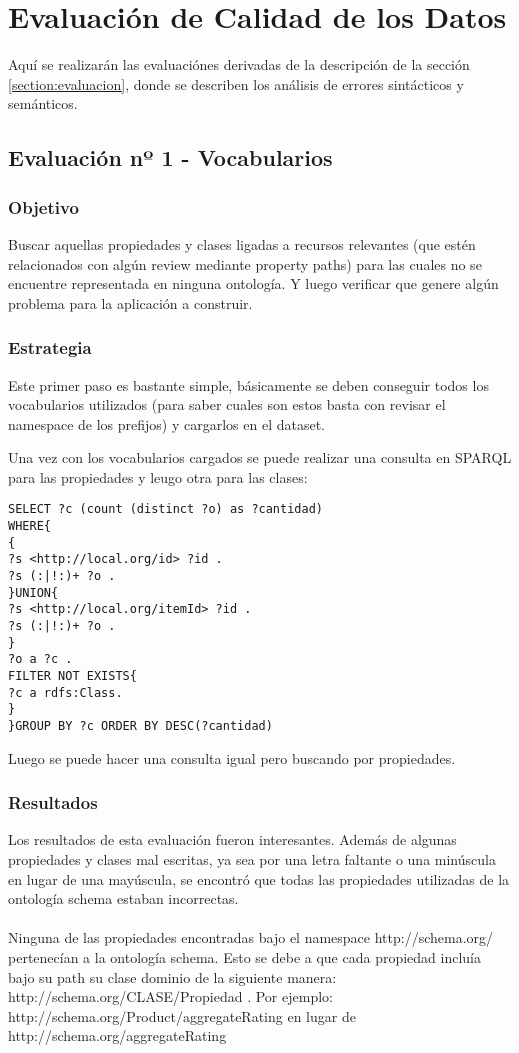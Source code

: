 \chapter{Evaluación de Calidad de los Datos}
\label{chapter:evaluacion}

Aquí se realizarán las evaluaciónes derivadas de la descripción de la sección \ref{section:evaluacion}, 
donde se describen los análisis de errores sintácticos y semánticos.

\section{Evaluación nº 1 - Vocabularios}
\label{section:evaluacion-vocabularios}

\subsection*{Objetivo}
Buscar aquellas propiedades y clases ligadas a recursos relevantes (que estén relacionados con algún review mediante property paths) 
para las cuales no se encuentre representada en ninguna ontología. Y luego verificar que genere algún problema para la aplicación a construir.

\subsection*{Estrategia}
Este primer paso es bastante simple, básicamente se deben conseguir todos los vocabularios utilizados (para saber cuales son estos basta con revisar el namespace 
de los prefijos) y cargarlos en el dataset.

Una vez con los vocabularios cargados se puede realizar una consulta en SPARQL para las propiedades y leugo otra para las clases:

\begin{lstlisting}[frame=single]
SELECT ?c (count (distinct ?o) as ?cantidad)
WHERE{
{
?s <http://local.org/id> ?id .
?s (:|!:)+ ?o .
}UNION{
?s <http://local.org/itemId> ?id .
?s (:|!:)+ ?o .
}
?o a ?c .
FILTER NOT EXISTS{
?c a rdfs:Class.
}
}GROUP BY ?c ORDER BY DESC(?cantidad)
\end{lstlisting}

\noindent Luego se puede hacer una consulta igual pero buscando por propiedades.

\subsection*{Resultados}
Los resultados de esta evaluación fueron interesantes. Además de algunas propiedades y clases mal escritas, ya sea por una letra faltante o una minúscula en lugar 
de una mayúscula, se encontró que todas las propiedades utilizadas de la ontología schema estaban incorrectas.
\\\\
Ninguna de las propiedades encontradas bajo el namespace http://schema.org/ pertenecían a la ontología schema.
Esto se debe a que cada propiedad incluía bajo su path su clase dominio de la siguiente manera: http://schema.org/CLASE/Propiedad .
Por ejemplo:
http://schema.org/Product/aggregateRating en lugar de http://schema.org/aggregateRating

